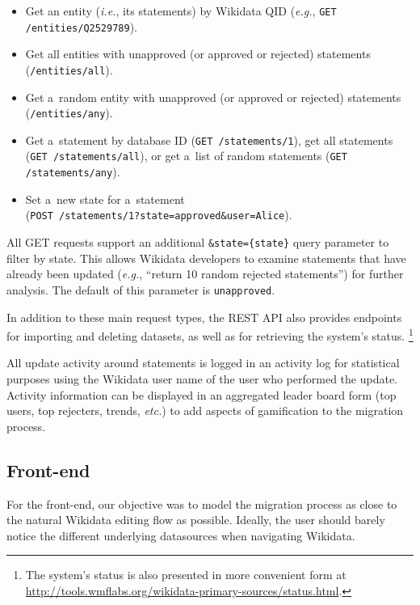 \documentclass{acm_proc_article-sp}
\begin{document}
\begin{itemize}
  \setlength\itemsep{0em}
  \item Get an entity (\emph{i.e.}, its statements) by Wikidata QID
  (\emph{e.g.}, \verb|GET /entities/Q2529789|).
  \item Get all entities with unapproved (or approved or rejected) statements
  (\verb|/entities/all|).
  \item Get a~random entity with unapproved (or approved or rejected) statements
  (\verb|/entities/any|).
  \item Get a~statement by database ID (\verb|GET /statements/1|), get all
    statements (\verb|GET /statements/all|), or get a~list of
  random statements (\verb|GET /statements/any|).
  \item Set a~new state for a~statement \\(\verb|POST /statements/1?state=approved&user=Alice|).
\end{itemize}

All GET requests support an additional \verb|&state={state}| query parameter to filter by state.
This allows Wikidata developers to examine statements
that have already been updated (\emph{e.g.}, ``return 10 random rejected statements'')
for further analysis.
The default of this parameter is \verb|unapproved|.

In addition to these main request types, the REST API also provides endpoints
for importing and deleting datasets, as well as for retrieving the system's status.%
\footnote{The system's status is also presented in more convenient form at
\url{http://tools.wmflabs.org/wikidata-primary-sources/status.html}.}

All update activity around statements is logged in an activity log
for statistical purposes using the Wikidata user name of the user who performed the update.
Activity information can be displayed in an aggregated leader board form
(top users, top rejecters, trends, \emph{etc.}) to add aspects of gamification to the migration process.

\subsection{Front-end}

For the front-end, our objective was to model the migration process
as close to the natural Wikidata editing flow as possible.
Ideally, the user should barely notice the different underlying datasources
when navigating Wikidata.
\end{document}
